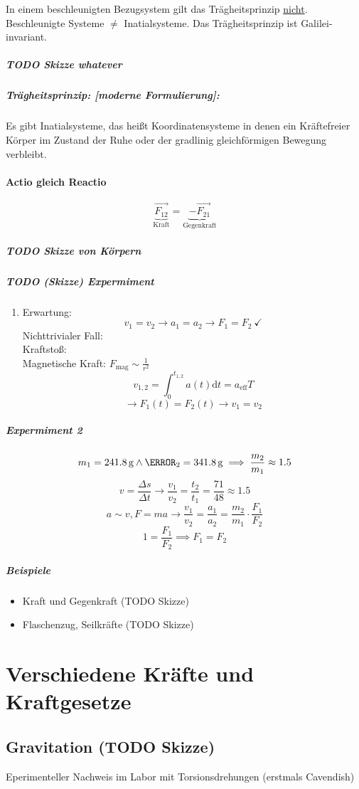 \documentclass[a4paper]{scrartcl}
\renewcommand{\d}{\mathrm{d}}
\newcommand{\f}[2]{{\frac{#1}{#2}}}
\renewcommand{\v}[1]{\vec{#1}}
\theoremstyle{definition}
\theoremstyle{plain}
\theoremstyle{plain}
\theoremstyle{remark}
\theoremstyle{remark}
\theoremstyle{remark}
\begin{document}
In einem beschleunigten Bezugsystem gilt das Trägheitsprinzip \uline{nicht}. Beschleunigte Systeme $\neq$ Inatialsysteme.
Das Trägheitsprinzip ist Galilei-invariant.

\subparagraph{{\bfseries\sffamily TODO} Skizze whatever}
\label{sec-2-2-1-5-1}
\subparagraph{Trägheitsprinzip: [moderne Formulierung]:}
\label{sec-2-2-1-5-2}
Es gibt Inatialsysteme, das heißt Koordinatensysteme  in denen ein Kräftefreier Körper im Zustand der Ruhe oder der gradlinig gleichförmigen Bewegung verbleibt.

\paragraph{Actio gleich Reactio}
\label{sec-2-2-1-6}
\[\underbrace{\v{F_{12}}}_{\text{Kraft}} = \underbrace{-\v{F_{21}}}_{\text{Gegenkraft}}\]
\subparagraph{{\bfseries\sffamily TODO} Skizze von Körpern}
\label{sec-2-2-1-6-1}
\subparagraph{{\bfseries\sffamily TODO} (Skizze) Expermiment}
\label{sec-2-2-1-6-2}
\begin{enumerate}
\item Erwartung:
\label{sec-2-2-1-6-2-1}
\[v_1 = v_2 \rightarrow a_1 = a_2 \rightarrow F_1 = F_2~\checkmark\]
Nichttrivialer Fall: \\
       Kraftstoß: \\
       Magnetische Kraft: $F_{\text{mag}} \sim {\f{1}{r^2}}$
\[v_{1,2} = \int_0^{t_{1,2}} a(t)\d t = a_{\text{eff}}T\]
\[\rightarrow F_1(t) = F_2(t) \rightarrow v_1 = v_2\]
\end{enumerate}
\subparagraph{Expermiment 2}
\label{sec-2-2-1-6-3}
\[m_1 = \SI{241.8}{\gram} \wedge \m_2 = \SI{341.8}{\gram} \implies \f{m_2}{m_1} \approx 1.5\]
\[v = \f{\Delta s}{\Delta t} \rightarrow \f{v_1}{v_2} = \f{t_2}{t_1} = \f{71}{48} \approx 1.5\]
\[a\sim v, F = m a \rightarrow \f{v_1}{v_2} = \f{a_1}{a_2} = \f{m_2}{m_1}\cdot \f{F_1}{F_2}\]
\[1 = \f{F_1}{F_2} \implies F_1 = F_2\]
\subparagraph{Beispiele}
\label{sec-2-2-1-6-4}
\begin{itemize}
\item Kraft und Gegenkraft (TODO Skizze)
\item Flaschenzug, Seilkräfte (TODO Skizze)
\end{itemize}
\section{Verschiedene Kräfte und Kraftgesetze}
\label{sec-3}
\subsection{Gravitation (TODO Skizze)}
\label{sec-3-1}
Eperimenteller Nachweis im Labor mit Torsionsdrehungen (erstmals Cavendish)
\end{document}
